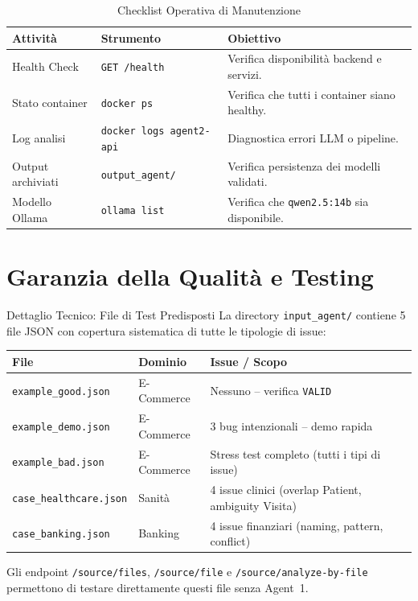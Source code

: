 \documentclass[12pt,a4paper]{report}
\begin{document}
\begin{table}[H]
\centering
\renewcommand{\arraystretch}{1.3}
\begin{tabularx}{\textwidth}{l l X}
\toprule
\textbf{Attività} & \textbf{Strumento} & \textbf{Obiettivo} \\
\midrule
Health Check        & \texttt{GET /health}         & Verifica disponibilità backend e servizi. \\
Stato container     & \texttt{docker ps}           & Verifica che tutti i container siano healthy. \\
Log analisi         & \texttt{docker logs agent2-api} & Diagnostica errori LLM o pipeline. \\
Output archiviati   & \texttt{output\_agent/}      & Verifica persistenza dei modelli validati. \\
Modello Ollama      & \texttt{ollama list}         & Verifica che \texttt{qwen2.5:14b} sia disponibile. \\
\bottomrule
\end{tabularx}
\caption{Checklist Operativa di Manutenzione}
\label{tab:maintenance}
\end{table}

\section{Garanzia della Qualità e Testing}

\begin{technicalbox}{Dettaglio Tecnico: File di Test Predisposti}
La directory \texttt{input\_agent/} contiene 5 file JSON con copertura
sistematica di tutte le tipologie di issue:

\begin{center}
\begin{tabularx}{\textwidth}{l l X}
\toprule
\textbf{File} & \textbf{Dominio} & \textbf{Issue / Scopo} \\
\midrule
\texttt{example\_good.json}    & E-Commerce & Nessuno -- verifica \texttt{VALID} \\
\texttt{example\_demo.json}    & E-Commerce & 3 bug intenzionali -- demo rapida \\
\texttt{example\_bad.json}     & E-Commerce & Stress test completo (tutti i tipi di issue) \\
\texttt{case\_healthcare.json} & Sanità     & 4 issue clinici (overlap Patient, ambiguity Visita) \\
\texttt{case\_banking.json}    & Banking    & 4 issue finanziari (naming, pattern, conflict) \\
\bottomrule
\end{tabularx}
\end{center}
Gli endpoint \texttt{/source/files}, \texttt{/source/file} e
\texttt{/source/analyze-by-file} permettono di testare direttamente
questi file senza Agent~1.
\end{technicalbox}
\end{document}
